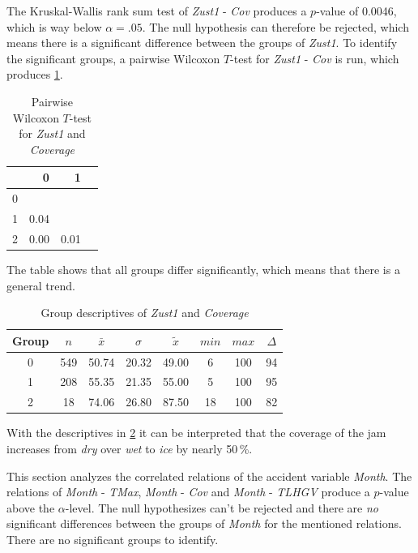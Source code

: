 The Kruskal-Wallis rank sum test of \textit{Zust1} - \textit{Cov} produces a $p$-value of 0.0046, which is way below $\alpha=.05$. The null hypothesis can therefore be rejected, which means there is a significant difference between the groups of \textit{Zust1}. To identify the significant groups, a pairwise Wilcoxon $T$-test for \textit{Zust1} - \textit{Cov} is run, which produces \cref{tbl:wilcoxon_baysis_initiator_Zust1_Cov}. 
\begin{table}[ht!]
	\tiny
	\centering
    \begin{tabular}{rrrr}
        \toprule
          & 0 & 1 \\ 
        \midrule
        0 &      & \\ 
        1 & 0.04 & \\ 
        2 & 0.00 & 0.01 \\ 
        \bottomrule
      \end{tabular}
    \caption{Pairwise Wilcoxon $T$-test for \textit{Zust1} and \textit{Coverage}}
    \label{tbl:wilcoxon_baysis_initiator_Zust1_Cov}
\end{table}
The table shows that all groups differ significantly, which means that there is a general trend.
\begin{table}[ht!]
	\tiny
	\centering
    \begin{tabular}{c|c|c|c|c|c|c|c}
        \toprule
        Group & $n$ & $\bar{x}$ & $\sigma$ & $\tilde{x}$ & $min$ & $max$ & $\Delta$ \\
        \midrule
        0 & 549 & 50.74 & 20.32 & 49.00 & 6  & 100 & 94 \\ 
        1 & 208 & 55.35 & 21.35 & 55.00 & 5  & 100 & 95 \\ 
        2 & 18  & 74.06 & 26.80 & 87.50 & 18 & 100 & 82 \\ 
        \bottomrule
      \end{tabular}
    \caption{Group descriptives of \textit{Zust1} and \textit{Coverage}}
    \label{tbl:descriptives_baysis_initiator_Zust1_Cov}
\end{table}
With the descriptives in \cref*{tbl:descriptives_baysis_initiator_Zust1_Cov} it can be interpreted that the coverage of the jam increases from \textit{dry} over \textit{wet} to \textit{ice} by nearly 50\,\%.

This section analyzes the correlated relations of the accident variable \textit{Month}. The relations of \textit{Month} - \textit{TMax}, \textit{Month} - \textit{Cov} and \textit{Month} - \textit{TLHGV} produce a $p$-value above the $\alpha$-level. The null hypothesizes can't be rejected and there are \textit{no} significant differences between the groups of \textit{Month} for the mentioned relations. There are no significant groups to identify.